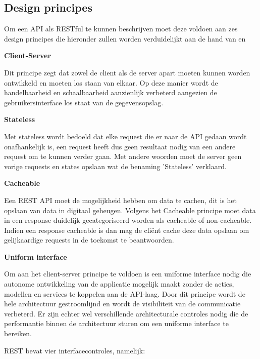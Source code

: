 \subsection{Design principes}
\label{subsec:Design principes}

Om een API als RESTful te kunnen beschrijven moet deze voldoen aan zes design principes die hieronder zullen worden verduidelijkt aan de hand van \textcite{Long} en \textcite{Naeem2021}

\textbf{Client-Server}

Dit principe zegt dat zowel de client als de server apart moeten kunnen worden ontwikkeld en moeten los staan van elkaar. Op deze manier wordt de handelbaarheid en schaalbaarheid aanzienlijk verbeterd aangezien de gebruikersinterface los staat van de gegevensopslag.


\textbf{Stateless}

Met stateless wordt bedoeld dat elke request die er naar de API gedaan wordt onafhankelijk is, een request heeft dus geen resultaat nodig van een andere request om te kunnen verder gaan. Met andere woorden moet de server geen vorige requests en states opslaan wat de benaming 'Stateless' verklaard.


\textbf{Cacheable}

Een REST API moet de mogelijkheid hebben om data te cachen, dit is het opslaan van data in digitaal geheugen. Volgens het Cacheable principe moet data in een response duidelijk gecategoriseerd worden als cacheable of non-cacheable. Indien een response cacheable is dan mag de cliënt cache deze data opslaan om gelijkaardige requests in de toekomst te beantwoorden.

\textbf{Uniform interface}

Om aan het client-server principe te voldoen is een uniforme interface nodig die autonome ontwikkeling van de applicatie mogelijk maakt zonder de acties, modellen en services te koppelen aan de API-laag. Door dit principe wordt de hele architectuur gestroomlijnd en wordt de visibiliteit van de communicatie verbeterd. Er zijn echter wel verschillende architecturale controles nodig die de performantie binnen de architectuur sturen om een uniforme interface te bereiken.

REST bevat vier interfacecontroles, namelijk: 

